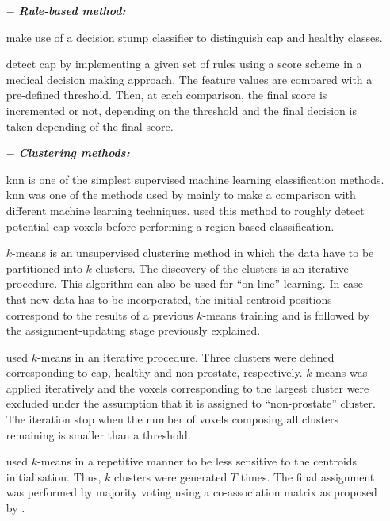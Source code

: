 \begin{enumerate}[leftmargin=*]

\item[$-$] \textbf{\textit{Rule-based method:}}

  \cite{Lv2009} make use of a decision stump classifier to distinguish \ac{cap} and healthy classes. 

  \cite{Puech2009} detect \ac{cap} by implementing a given set of rules using a score scheme in a medical decision making approach. The feature values are compared with a pre-defined threshold. Then, at each comparison, the final score is incremented or not, depending on the threshold and the final decision is taken depending of the final score.

\item[$-$] \textbf{\textit{Clustering methods:}} 

  \acf{knn} is one of the simplest supervised machine learning classification methods. \ac{knn} was one of the methods used by \cite{Niaf2011,Niaf2012} mainly to make a comparison with different machine learning techniques. \cite{Litjens2012} used this method to roughly detect potential \ac{cap} voxels before performing a region-based classification.

  $k$-means is an unsupervised clustering method in which the data have to be partitioned into $k$ clusters. The discovery of the clusters is an iterative procedure. This algorithm can also be used for ``on-line'' learning. In case that new data has to be incorporated, the initial centroid positions correspond to the results of a previous $k$-means training and is followed by the assignment-updating stage previously explained.

  \cite{Tiwari2007,Tiwari2009} used $k$-means in an iterative procedure. Three clusters were defined corresponding to \ac{cap}, healthy and non-prostate, respectively. $k$-means was applied iteratively and the voxels corresponding to the largest cluster were excluded under the assumption that it is assigned to ``non-prostate'' cluster. The iteration stop when the number of voxels composing all clusters remaining is smaller than a threshold.

  \cite{Tiwari2008,Viswanath2008,Viswanath2008a} used $k$-means in a repetitive manner to be less sensitive to the centroids initialisation. Thus, $k$ clusters were generated $T$ times. The final assignment was performed by majority voting using a co-association matrix as proposed by \cite{Fred2005}.


\end{enumerate}
